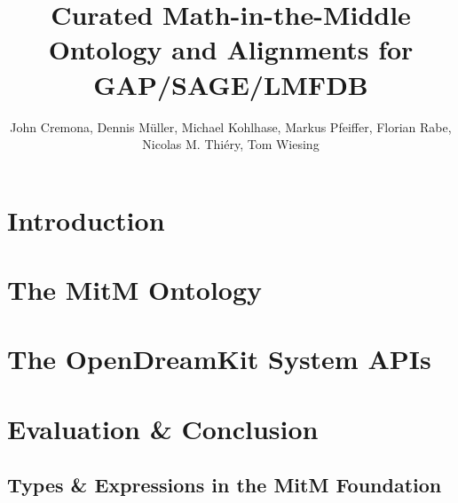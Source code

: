 \documentclass{deliverablereport}
\title{Curated Math-in-the-Middle Ontology and Alignments for GAP/SAGE/LMFDB}
\author{John Cremona, Dennis M\"uller, Michael Kohlhase, Markus Pfeiffer, Florian Rabe, Nicolas M. Thiéry, Tom Wiesing}
\begin{document}
\begin{abstract}\end{abstract}
\maketitle 
\newpage\tableofcontents\newpage

\section{Introduction}\label{sec:intro}
\newpage

\section{The MitM Ontology}\label{sec:mitmonto}
\newpage

\section{The OpenDreamKit System APIs}\label{sec:sysapis}
\newpage

\section{Evaluation \& Conclusion}\label{sec:concl}
\newpage
\printbibliography\newpage

\begin{appendix}
  \section{Types \& Expressions in the MitM Foundation}\label{app:types}
  
  
\end{appendix}
\end{document}
